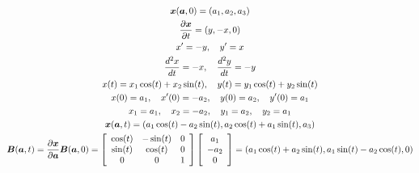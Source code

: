\documentclass{article}
\begin{document}
\begin{enumerate}
\begin{gather*}
        \boldsymbol{x}(\boldsymbol{a}, 0) = \left(a_1, a_2, a_3\right)\\
        \frac{\partial \boldsymbol{x}}{\partial t} = \left(y, -x, 0\right)\\
        x' = -y, \quad y' = x\\
        \frac{d^2x}{dt} = -x, \quad \frac{d^2y}{dt} = -y\\
        x(t) = x_1\cos(t) + x_2\sin(t), \quad y(t) = y_1\cos(t) + y_2\sin(t)\\
        x(0) = a_1, \quad x'(0) = -a_2, \quad y(0) = a_2, \quad y'(0) = a_1\\
        x_1 = a_1, \quad x_2 = -a_2, \quad y_1 = a_2, \quad y_2 = a_1\\
        \boldsymbol{x}(\boldsymbol{a},t) = \left(a_1\cos(t) - a_2\sin(t), a_2\cos(t) + a_1\sin(t),
        a_3\right)\\
        \boldsymbol{B}(\boldsymbol{a},t) = \frac{\partial \boldsymbol{x}}{\partial \boldsymbol{a}}\boldsymbol{B}(\boldsymbol{a},0)
        = \left[\begin{array}{c c c}
        \cos(t) & -\sin(t) & 0\\
        \sin(t) & \cos(t) & 0\\
        0 & 0 & 1\end{array}\right] \left[\begin{array}{c}
        a_1\\-a_2\\0\end{array}\right] = \left(a_1\cos(t) + a_2\sin(t),
        a_1\sin(t) - a_2\cos(t), 0\right)
    \end{gather*}
\end{enumerate}
\end{document}
